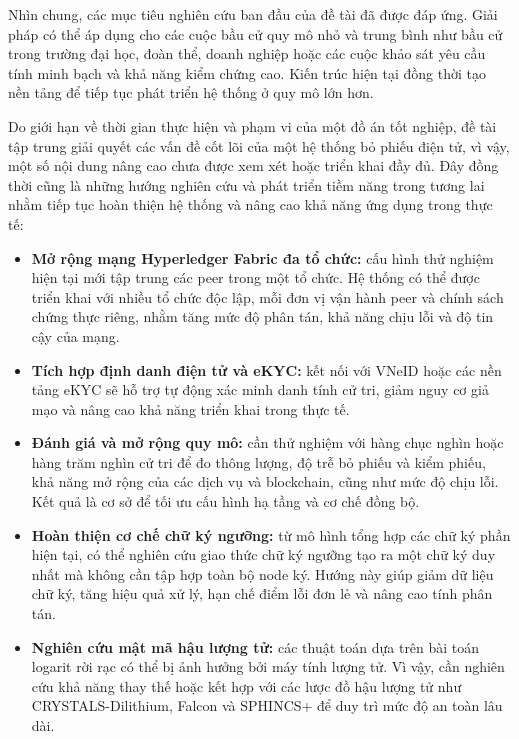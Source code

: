 Nhìn chung, các mục tiêu nghiên cứu ban đầu của đề tài đã được đáp ứng. Giải pháp có thể áp dụng cho các cuộc bầu cử quy mô nhỏ và trung bình như bầu cử trong trường đại học, đoàn thể, doanh nghiệp hoặc các cuộc khảo sát yêu cầu tính minh bạch và khả năng kiểm chứng cao. Kiến trúc hiện tại đồng thời tạo nền tảng để tiếp tục phát triển hệ thống ở quy mô lớn hơn.

Do giới hạn về thời gian thực hiện và phạm vi của một đồ án tốt nghiệp, đề tài tập trung giải quyết các vấn đề cốt lõi của một hệ thống bỏ phiếu điện tử, vì vậy, một số nội dung nâng cao chưa được xem xét hoặc triển khai đầy đủ. Đây đồng thời cũng là những hướng nghiên cứu và phát triển tiềm năng trong tương lai nhằm tiếp tục hoàn thiện hệ thống và nâng cao khả năng ứng dụng trong thực tế:

\begin{itemize}
    \item \textbf{Mở rộng mạng Hyperledger Fabric đa tổ chức:} cấu hình thử nghiệm hiện tại mới tập trung các peer trong một tổ chức. Hệ thống có thể được triển khai với nhiều tổ chức độc lập, mỗi đơn vị vận hành peer và chính sách chứng thực riêng, nhằm tăng mức độ phân tán, khả năng chịu lỗi và độ tin cậy của mạng.

    \item \textbf{Tích hợp định danh điện tử và eKYC:} kết nối với VNeID hoặc các nền tảng eKYC sẽ hỗ trợ tự động xác minh danh tính cử tri, giảm nguy cơ giả mạo và nâng cao khả năng triển khai trong thực tế.

    \item \textbf{Đánh giá và mở rộng quy mô:} cần thử nghiệm với hàng chục nghìn hoặc hàng trăm nghìn cử tri để đo thông lượng, độ trễ bỏ phiếu và kiểm phiếu, khả năng mở rộng của các dịch vụ và blockchain, cũng như mức độ chịu lỗi. Kết quả là cơ sở để tối ưu cấu hình hạ tầng và cơ chế đồng bộ.

    \item \textbf{Hoàn thiện cơ chế chữ ký ngưỡng:} từ mô hình tổng hợp các chữ ký phần hiện tại, có thể nghiên cứu giao thức chữ ký ngưỡng tạo ra một chữ ký duy nhất mà không cần tập hợp toàn bộ node ký. Hướng này giúp giảm dữ liệu chữ ký, tăng hiệu quả xử lý, hạn chế điểm lỗi đơn lẻ và nâng cao tính phân tán.

    \item \textbf{Nghiên cứu mật mã hậu lượng tử:} các thuật toán dựa trên bài toán logarit rời rạc có thể bị ảnh hưởng bởi máy tính lượng tử. Vì vậy, cần nghiên cứu khả năng thay thế hoặc kết hợp với các lược đồ hậu lượng tử như CRYSTALS-Dilithium, Falcon và SPHINCS+ để duy trì mức độ an toàn lâu dài.
\end{itemize}
